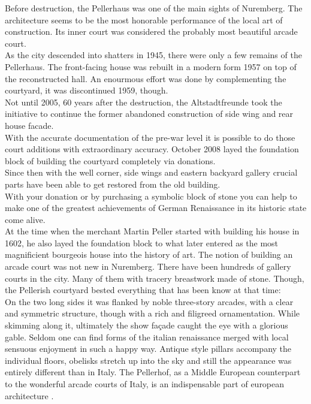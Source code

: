Before destruction, the Pellerhaus was one of the main sights of Nuremberg. The architecture seems to be the most honorable performance of the local art of construction. Its inner court was considered the probably most beautiful arcade court.\\
As the city descended into shatters in 1945, there were only a few remains of the Pellerhaus. The front-facing house was rebuilt in a modern form 1957 on top of the reconstructed hall. An enourmous effort was done by complementing the courtyard, it was discontinued 1959, though.\\
Not until 2005, 60 years after the destruction, the Altstadtfreunde took the initiative to continue the former abandoned construction of side wing and rear house facade.\\
With the accurate documentation of the pre-war level it is possible to do those court additions with extraordinary accuracy. October 2008 layed the foundation block of building the courtyard completely via donations.\\
Since then with the well corner, side wings and eastern backyard gallery crucial parts have been able to get restored from the old building.\\
With your donation or by purchasing a symbolic block of stone you can help to make one of the greatest achievements of German Renaissance in its historic state come alive.\\
At the time when the merchant Martin Peller started with building his house in 1602, he also layed the foundation block to what later entered as the most magnificient bourgeois house into the history of art. The notion of building an arcade court was not new in Nuremberg. There have been hundreds of gallery courts in the city. Many of them with tracery breastwork made of stone. Though, the Pellerish courtyard bested everything that has been know at that time:\\
On the two long sides it was flanked by noble three-story arcades, with a clear and symmetric structure, though with a rich and filigreed ornamentation. While skimming along it, ultimately the show façade caught the eye with a glorious gable. Seldom one can find forms of the italian renaissance merged with local sensuous enjoyment in such a happy way. Antique style pillars accompany the individual floors, obelisks stretch up into the sky and still the appearance was entirely different than in Italy. The Pellerhof, as a Middle European counterpart to the wonderful arcade courts of Italy, is an indispensable part of european architecture \parencite[translated from German]{afWiederaufbauDesPellerhofes}.\\\\

